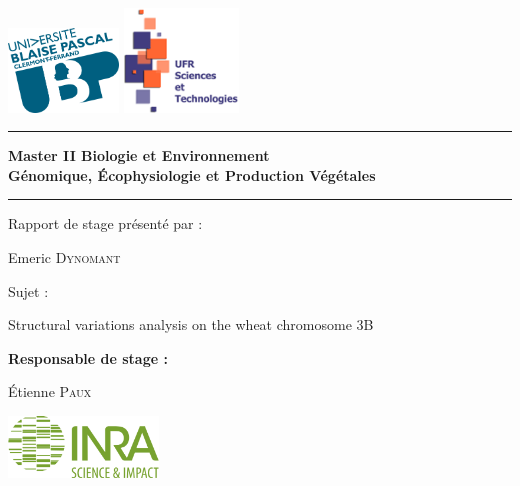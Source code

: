 \documentclass[a4paper, 12pt]{article}
\begin{document}
\begin{onehalfspace}

\begin{titlepage}
  \centering
     \includegraphics[width=0.22\textwidth]{logo/logo_blaisepascal.png}
     \hfill
	\includegraphics[width=0.23\textwidth]{logo/logo_ufr.png}
	
    \vspace{1cm}
    
       \rule{10cm}{0.2pt}
       
       \large\textbf{Master II Biologie et Environnement \\
       Génomique, Écophysiologie et Production Végétales}
       
       \rule{10cm}{0.2pt}
       
    \vspace{1cm}
    
        \Large{Rapport de stage présenté par :}
        
        \LARGE{Emeric} \LARGE\textsc{Dynomant}
        
    \vspace{1cm}
    
        \Large{Sujet :}
        
        \LARGE{Structural variations analysis on the wheat chromosome 3B}
        
    \vspace{3cm}
    
\begin{flushleft}
	    \large\textbf{Responsable de stage :}
	    
	    Étienne \textsc{Paux}
\end{flushleft}

\begin{flushright}
        \vspace{1cm}
        
	    \includegraphics[width=0.3\textwidth]{logo/logo_inra.jpg}
\end{flushright}


\end{titlepage}
\end{onehalfspace}
\end{document}
